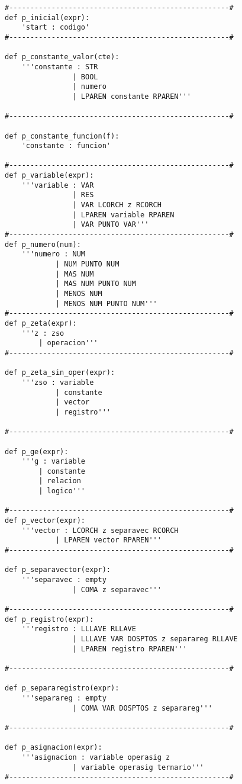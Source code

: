 \begin{verbatim}



#----------------------------------------------------#
def p_inicial(expr):
	'start : codigo'
#----------------------------------------------------#

def p_constante_valor(cte):
	'''constante : STR	
				| BOOL
				| numero
				| LPAREN constante RPAREN'''

#----------------------------------------------------#

def p_constante_funcion(f):
	'constante : funcion'

#----------------------------------------------------#
def p_variable(expr):
	'''variable : VAR
				| RES
				| VAR LCORCH z RCORCH
				| LPAREN variable RPAREN
				| VAR PUNTO VAR'''
#----------------------------------------------------#
def p_numero(num):
	'''numero : NUM
			| NUM PUNTO NUM
			| MAS NUM
			| MAS NUM PUNTO NUM
			| MENOS NUM
			| MENOS NUM PUNTO NUM'''
#----------------------------------------------------#
def p_zeta(expr):
	'''z : zso
		| operacion'''
#----------------------------------------------------#

def p_zeta_sin_oper(expr):
	'''zso : variable
			| constante
			| vector
			| registro'''

#----------------------------------------------------#

def p_ge(expr):
	'''g : variable
		| constante 
		| relacion
		| logico'''

#----------------------------------------------------#
def p_vector(expr):
	'''vector : LCORCH z separavec RCORCH
			| LPAREN vector RPAREN'''			
#----------------------------------------------------#

def p_separavector(expr):
	'''separavec : empty
				| COMA z separavec'''

#----------------------------------------------------#
def p_registro(expr):
	'''registro : LLLAVE RLLAVE
				| LLLAVE VAR DOSPTOS z separareg RLLAVE
				| LPAREN registro RPAREN'''

#----------------------------------------------------#

def p_separaregistro(expr):
	'''separareg : empty
				| COMA VAR DOSPTOS z separareg'''

#----------------------------------------------------#

def p_asignacion(expr):
	'''asignacion : variable operasig z
				| variable operasig ternario'''
#----------------------------------------------------#


\end{verbatim}
